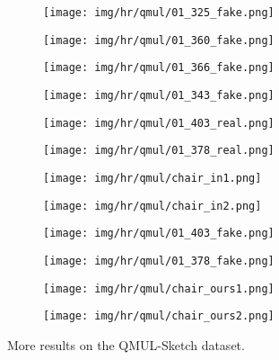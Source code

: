 \documentclass[10pt,twocolumn,letterpaper]{article}
\begin{document}
\begin{figure*}[tbp]
\begin{center}
\begin{subfigure}[b]{\hrwidth\linewidth}
  \texttt{[image: img/hr/qmul/01\_325\_fake.png]}
  \end{subfigure}
  \begin{subfigure}[b]{\hrwidth\linewidth}
  \texttt{[image: img/hr/qmul/01\_360\_fake.png]}
  \end{subfigure}
\begin{subfigure}[b]{\hrwidth\linewidth}
  \texttt{[image: img/hr/qmul/01\_366\_fake.png]}
  \end{subfigure}
  \begin{subfigure}[b]{\hrwidth\linewidth}
  \texttt{[image: img/hr/qmul/01\_343\_fake.png]}
  \end{subfigure}
  
\begin{subfigure}[b]{\hrwidth\linewidth}
  \texttt{[image: img/hr/qmul/01\_403\_real.png]}
  \end{subfigure}
  \begin{subfigure}[b]{\hrwidth\linewidth}
  \texttt{[image: img/hr/qmul/01\_378\_real.png]}
  \end{subfigure}
\begin{subfigure}[b]{\hrwidth\linewidth}
  \texttt{[image: img/hr/qmul/chair\_in1.png]}
  \end{subfigure}
  \begin{subfigure}[b]{\hrwidth\linewidth}
  \texttt{[image: img/hr/qmul/chair\_in2.png]}
  \end{subfigure}
  
\begin{subfigure}[b]{\hrwidth\linewidth}
  \texttt{[image: img/hr/qmul/01\_403\_fake.png]}
  \end{subfigure}
  \begin{subfigure}[b]{\hrwidth\linewidth}
  \texttt{[image: img/hr/qmul/01\_378\_fake.png]}
  \end{subfigure}
\begin{subfigure}[b]{\hrwidth\linewidth}
  \texttt{[image: img/hr/qmul/chair\_ours1.png]}
  \end{subfigure}
  \begin{subfigure}[b]{\hrwidth\linewidth}
  \texttt{[image: img/hr/qmul/chair\_ours2.png]}
  \end{subfigure}
  
\end{center}
\caption{More  results on the QMUL-Sketch dataset.}
 \label{fig:hr_qmul}
\end{figure*}
\end{document}
